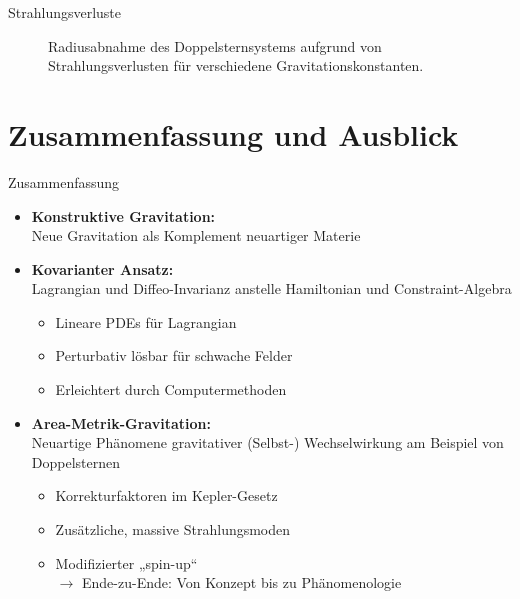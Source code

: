 \documentclass{beamer}
\begin{document}
    \begin{frame}{Strahlungsverluste}
        \begin{figure}
            \centering
            \begin{subfigure}{.49\textwidth}
                \centering
                \resizebox{1.1\textwidth}{!}{}
            \end{subfigure}
            \hfill
            \begin{subfigure}{.49\textwidth}
                \centering
                \resizebox{1.1\textwidth}{!}{}
            \end{subfigure}
            \caption{Radiusabnahme des Doppelsternsystems aufgrund von Strahlungsverlusten für verschiedene Gravitationskonstanten.}
            \label{fig:spinup}
        \end{figure}
    \end{frame}


    \section{Zusammenfassung und Ausblick}\label{sec:ausblick}

    \begin{frame}{Zusammenfassung}
        \begin{itemize}
            \item \textbf{Konstruktive Gravitation:} \\ Neue Gravitation als Komplement neuartiger Materie \pause
            \item \textbf{Kovarianter Ansatz:} \\
            Lagrangian und Diffeo-Invarianz anstelle Hamiltonian und Constraint-Algebra
            \begin{itemize}
                \item Lineare PDEs für Lagrangian
                \item Perturbativ lösbar für schwache Felder
                \item Erleichtert durch Computermethoden
            \end{itemize} \pause
            \item \textbf{Area-Metrik-Gravitation:} \\
            Neuartige Phänomene gravitativer (Selbst-) Wechselwirkung am Beispiel von Doppelsternen
            \begin{itemize}
                \item Korrekturfaktoren im Kepler-Gesetz
                \item Zusätzliche, massive Strahlungsmoden
                \item Modifizierter „spin-up“ \pause \\
                \alert{$\rightarrow$ Ende-zu-Ende: Von Konzept bis zu Phänomenologie}
            \end{itemize}
        \end{itemize}
    \end{frame}
\end{document}
